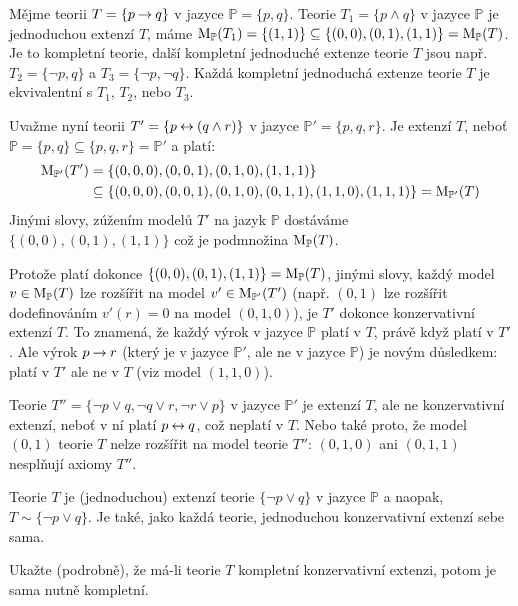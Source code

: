 \begin{example}
Mějme teorii $T=\{p\mathbin{\rightarrow} q\}$ v jazyce $\mathbb P=\{p,q\}$. Teorie $T_1=\{p\land q\}$ v jazyce $\mathbb P$ je jednoduchou extenzí $T$, máme $\operatorname{M}_\mathbb P(T_1)=\{(1,1)\}\subseteq\{(0,0),(0,1),(1,1)\}=\operatorname{M}_\mathbb P(T)$. Je to kompletní teorie, další kompletní jednoduché extenze teorie $T$ jsou např.\ $T_2=\{\neg p,q\}$ a $T_3=\{\neg p,\neg q\}$. Každá kompletní jednoduchá extenze teorie $T$ je ekvivalentní s $T_1$, $T_2$, nebo $T_3$.

Uvažme nyní teorii $T'=\{p\mathbin{\leftrightarrow} (q\land r)\}$ v jazyce $\mathbb P'=\{p,q,r\}$. Je extenzí $T$, neboť $\mathbb P=\{p,q\}\subseteq\{p,q,r\}=\mathbb P'$ a platí:
\begin{align*}
    \operatorname{M}_{\mathbb P'}(T')&=\{(0,0,0),(0,0,1),(0,1,0),(1,1,1)\}\\ 
    &\subseteq\{(0,0,0),(0,0,1),(0,1,0),(0,1,1),(1,1,0),(1,1,1)\}=\operatorname{M}_{\mathbb P'}(T)     
\end{align*}
Jinými slovy, zúžením modelů $T'$ na jazyk $\mathbb P$ dostáváme $\{(0,0),(0,1),(1,1)\}$ což je podmnožina $\operatorname{M}_\mathbb P(T)$. 

Protože platí dokonce $\{(0,0),(0,1),(1,1)\}=\operatorname{M}_\mathbb P(T)$, jinými slovy, každý model $v\in\operatorname{M}_\mathbb P(T)$ lze rozšířit na model $v'\in\operatorname{M}_{\mathbb P'}(T')$ (např. $(0,1)$ lze rozšířit dodefinováním $v'(r)=0$ na model $(0,1,0)$), je $T'$ dokonce konzervativní extenzí $T$. To znamená, že každý výrok v jazyce $\mathbb P$ platí v $T$, právě když platí v $T'$. Ale výrok $p\mathbin{\rightarrow} r$ (který je v jazyce $\mathbb P'$, ale ne v jazyce $\mathbb P$) je novým důsledkem: platí v $T'$ ale ne v $T$ (viz model $(1,1,0)$).

Teorie $T''=\{\neg p\lor q,\neg q\lor r,\neg r\lor p\}$ v jazyce $\mathbb P'$ je extenzí $T$, ale ne konzervativní extenzí, neboť v ní platí $p\mathbin{\leftrightarrow} q$, což neplatí v $T$. Nebo také proto, že model $(0, 1)$ teorie $T$ nelze rozšířit na model teorie $T''$: $(0,1,0)$ ani $(0,1,1)$ nesplňují axiomy $T''$.

Teorie $T$ je (jednoduchou) extenzí teorie $\{\neg p\lor q\}$ v jazyce $\mathbb P$ a naopak, $T\sim\{\neg p\lor q\}$. Je také, jako každá teorie, jednoduchou konzervativní extenzí sebe sama.
\end{example}

\begin{exercise}
    Ukažte (podrobně), že má-li teorie $T$ kompletní konzervativní extenzi, potom je sama nutně kompletní.
\end{exercise}

